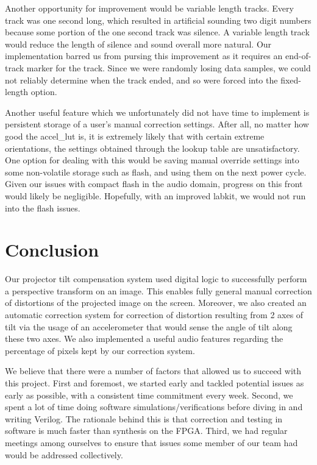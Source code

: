 \documentclass{article}
\begin{document}
Another opportunity for improvement would be variable length tracks.
Every track was one second long, which resulted in artificial sounding two digit numbers because some portion of the one second track was silence.
A variable length track would reduce the length of silence and sound overall more natural.
Our implementation barred us from pursing this improvement as it requires an end-of-track marker for the track.
Since we were randomly losing data samples, we could not reliably determine when the track ended, and so were forced into the fixed-length option.

Another useful feature which we unfortunately did not have time to implement is persistent storage of a user's manual correction settings.
After all, no matter how good the accel\_lut is, it is extremely likely that with certain extreme orientations,
the settings obtained through the lookup table are unsatisfactory.
One option for dealing with this would be saving manual override settings into some non-volatile storage such as flash,
and using them on the next power cycle.
Given our issues with compact flash in the audio domain, progress on this front would likely be negligible.
Hopefully, with an improved labkit, we would not run into the flash issues.

\section{Conclusion}
Our projector tilt compensation system used digital logic to successfully perform a perspective transform on an image.
This enables fully general manual correction of distortions of the projected image on the screen.
Moreover, we also created an automatic correction system for correction of distortion resulting from 2 axes of tilt
via the usage of an accelerometer that would sense the angle of tilt along these two axes.
We also implemented a useful audio features regarding the percentage of pixels kept by our correction system.

We believe that there were a number of factors that allowed us to succeed with this project.
First and foremost, we started early and tackled potential issues as early as possible, with a consistent time commitment every week.
Second, we spent a lot of time doing software simulations/verifications before diving in and writing Verilog.
The rationale behind this is that correction and testing in software is much faster than synthesis on the FPGA.
Third, we had regular meetings among ourselves to ensure that issues some member of our team had would be addressed collectively.
\end{document}
